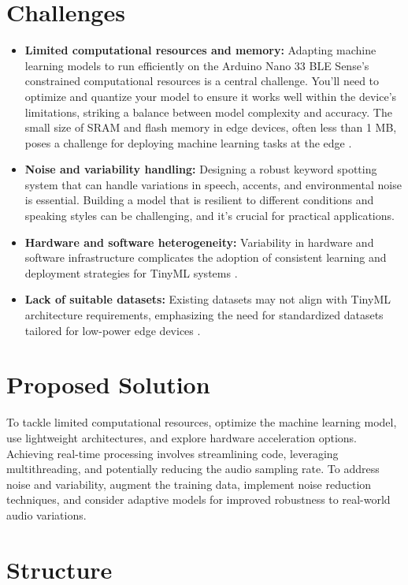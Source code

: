 \section{Challenges}

\begin{itemize}
	\item\textbf{Limited computational resources and memory:} Adapting machine learning models to run efficiently on the Arduino Nano 33 BLE Sense's constrained computational resources is a central challenge. You'll need to optimize and quantize your model to ensure it works well within the device's limitations, striking a balance between model complexity and accuracy. The small size of SRAM and flash memory in edge devices, often less than 1 MB, poses a challenge for deploying machine learning tasks at the edge \cite{Ray:2022}.
	\item\textbf{Noise and variability handling:} Designing a robust keyword spotting system that can handle variations in speech, accents, and environmental noise is essential. Building a model that is resilient to different conditions and speaking styles can be challenging, and it's crucial for practical applications.
	\item \textbf{Hardware and software heterogeneity:} Variability in hardware and software infrastructure complicates the adoption of consistent learning and deployment strategies for TinyML systems \cite{Ray:2022}.
 	\item\textbf{Lack of suitable datasets:} Existing datasets may not align with TinyML architecture requirements, emphasizing the need for standardized datasets tailored for low-power edge devices \cite{Ray:2022}.
\end{itemize}

\section{Proposed Solution}

To tackle limited computational resources, optimize the machine learning model, use lightweight architectures, and explore hardware acceleration options. Achieving real-time processing involves streamlining code, leveraging multithreading, and potentially reducing the audio sampling rate. To address noise and variability, augment the training data, implement noise reduction techniques, and consider adaptive models for improved robustness to real-world audio variations.

\section{Structure}

